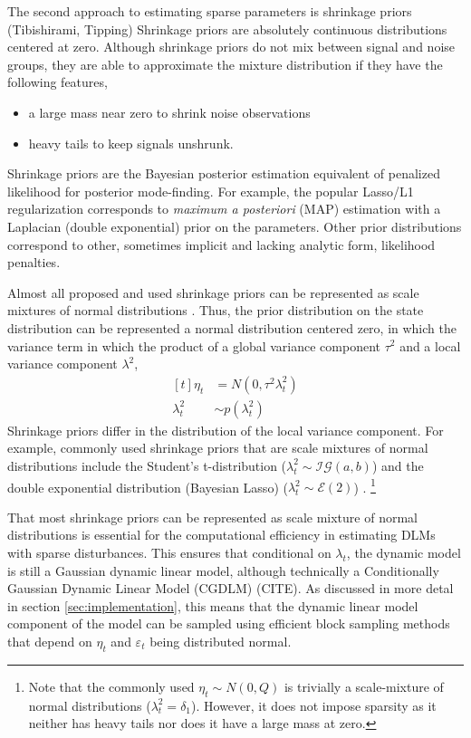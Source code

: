 \documentclass{article}
\newcommand{\dist}[1]{\mathcal{#1}}
\newcommand{\paren}[1]{\ensuremath{\left(#1\right)}}
\newcommand{\dinvgamma}[1]{\ensuremath{\dist{IG}\paren{#1}}}
\newcommand{\dexp}[1]{\ensuremath{\dist{E}\paren{#1}}}
\begin{document}
The second approach to estimating sparse parameters is shrinkage priors (Tibishirami, Tipping)
Shrinkage priors are absolutely continuous distributions centered at zero.
Although shrinkage priors do not mix between signal and noise groups, they are able to approximate the mixture distribution if they have the following features,
\begin{itemize}
\item a large mass near zero to shrink noise observations
\item heavy tails to keep signals unshrunk.
\end{itemize}
Shrinkage priors are the Bayesian posterior estimation equivalent of penalized likelihood for posterior mode-finding.
For example, the popular Lasso/L1 regularization corresponds to \textit{maximum a posteriori} (MAP) estimation with a Laplacian (double exponential) prior on the parameters.
Other prior distributions correspond to other, sometimes implicit and lacking analytic form, likelihood penalties.

Almost all proposed and used shrinkage priors can be represented as scale mixtures of normal distributions \parencite{PolsonScott2010}.
Thus, the prior distribution on the state distribution can be represented a normal distribution centered zero, in which the variance term in which the product of a global variance component $\tau^{2}$ and a local variance component $\lambda^{2}$,
\begin{equation}
  \label{eq:3}
  \begin{aligned}[t]
    \eta_{t} &= N(0, \tau^{2} \lambda_{t}^{2}) \\
    \lambda_{t}^{2} &\sim p(\lambda_{t}^{2})
  \end{aligned}
\end{equation}
Shrinkage priors differ in the distribution of the local variance component.%
For example, commonly used shrinkage priors that are scale mixtures of normal distributions include the Student's t-distribution ($\lambda^{2}_{t} \sim \dinvgamma{a, b}$) and the double exponential distribution (Bayesian Lasso) ($\lambda^{2}_{t} \sim \dexp{2}$) \textcite[74]{CarvalhoPolsonScott2009}.
\footnote{
Note that the commonly used $\eta_{t} \sim N(0, Q)$ is trivially a scale-mixture of normal distributions ($\lambda_{t}^{2} = \delta_{1}$).
However, it does not impose sparsity as it neither has heavy tails nor does it have a large mass at zero.
}

That most shrinkage priors can be represented as scale mixture of normal distributions is essential for the computational efficiency in estimating DLMs with sparse disturbances.
This ensures that conditional on $\lambda_{t}$, the dynamic model is still a Gaussian dynamic linear model, although technically a Conditionally Gaussian Dynamic Linear Model (CGDLM) (CITE).
As discussed in more detal in section \ref{sec:implementation}, this means that the dynamic linear model component of the model can be sampled using efficient block sampling methods that depend on $\eta_{t}$ and $\varepsilon_{t}$ being distributed normal.
\end{document}

